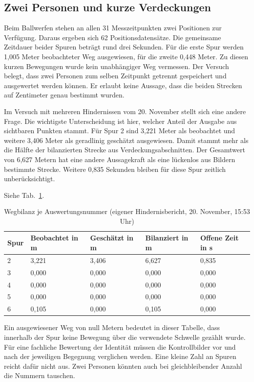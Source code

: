 \subsection{Zwei Personen und kurze Verdeckungen}
Beim Ballwerfen stehen an allen 31 Messzeitpunkten zwei Positionen zur Verfügung. Daraus ergeben sich 62 Positionsdatensätze. Die gemeinsame Zeitdauer beider Spuren beträgt rund drei Sekunden. Für die erste Spur werden 1,005 Meter beobachteter Weg ausgewiesen, für die zweite 0,448 Meter. Zu diesen kurzen Bewegungen wurde kein unabhängiger Weg vermessen. Der Versuch belegt, dass zwei Personen zum selben Zeitpunkt getrennt gespeichert und ausgewertet werden können. Er erlaubt keine Aussage, dass die beiden Strecken auf Zentimeter genau bestimmt wurden.

Im Versuch mit mehreren Hindernissen vom 20. November stellt sich eine andere Frage. Die wichtigste Unterscheidung ist hier, welcher Anteil der Ausgabe aus sichtbaren Punkten stammt. Für Spur 2 sind 3,221 Meter als beobachtet und weitere 3,406 Meter als geradlinig geschätzt ausgewiesen. Damit stammt mehr als die Hälfte der bilanzierten Strecke aus Verdeckungsabschnitten. Der Gesamtwert von 6,627 Metern hat eine andere Aussagekraft als eine lückenlos aus Bildern bestimmte Strecke. Weitere 0,835 Sekunden bleiben für diese Spur zeitlich unberücksichtigt.

Siehe Tab.~\ref{tab:em-hind}.
\begin{table}[htbp]\centering\caption{Wegbilanz je Auswertungsnummer (eigener Hindernisbericht, 20. November, 15:53 Uhr)}\label{tab:em-hind}
\begin{tabular}{@{}lllll@{}}\toprule Spur & Beobachtet in m & Geschätzt in m & Bilanziert in m & Offene Zeit in s\\\midrule
2 & 3,221 & 3,406 & 6,627 & 0,835\\
3 & 0,000 & 0,000 & 0,000 & 0,000\\
4 & 0,000 & 0,000 & 0,000 & 0,000\\
5 & 0,000 & 0,000 & 0,000 & 0,000\\
6 & 0,105 & 0,000 & 0,105 & 0,000\\\bottomrule\end{tabular}\end{table}
Ein ausgewiesener Weg von null Metern bedeutet in dieser Tabelle, dass innerhalb der Spur keine Bewegung über die verwendete Schwelle gezählt wurde. Für eine fachliche Bewertung der Identität müssen die Kontrollbilder vor und nach der jeweiligen Begegnung verglichen werden. Eine kleine Zahl an Spuren reicht dafür nicht aus. Zwei Personen könnten auch bei gleichbleibender Anzahl die Nummern tauschen.

